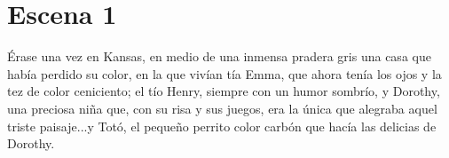 \chapter{Escena 1}

Érase una vez en Kansas, en medio de una inmensa pradera gris una casa que había perdido su color, en la que vivían tía Emma, que ahora tenía los ojos y la tez de color ceniciento; el tío Henry, siempre con un humor sombrío, y Dorothy, una preciosa niña que, con su risa y sus juegos, era la única que alegraba aquel triste paisaje...y Totó, el pequeño perrito color carbón que hacía las delicias de Dorothy.



